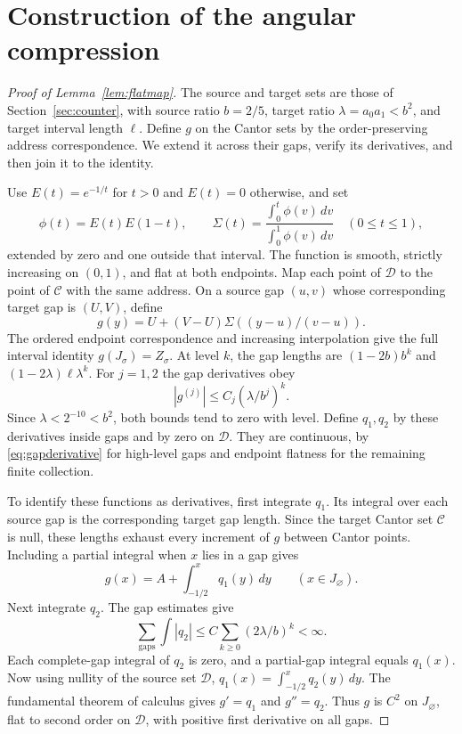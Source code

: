 \documentclass[11pt]{amsart}
\theoremstyle{definition}
\theoremstyle{remark}
\numberwithin{equation}{section}
\begin{document}
\section{Construction of the angular compression}\label{app:compression}
\begin{proof}[Proof of Lemma~\ref{lem:flatmap}]
The source and target sets are those of Section~\ref{sec:counter},
with source ratio $b=2/5$, target ratio $\lambda=a_0a_1<b^2$,
and target interval length $\ell$. Define $g$ on the Cantor sets
by the order-preserving address correspondence. We extend it
across their gaps, verify its derivatives, and then join it to
the identity.

Use $E(t)=e^{-1/t}$ for $t>0$ and $E(t)=0$ otherwise, and set
\[
\phi(t)=E(t)E(1-t),\qquad
\Sigma(t)=\frac{\int_0^t\phi(v)\,dv}{\int_0^1\phi(v)\,dv}
\quad(0\le t\le1),
\]
extended by zero and one outside that interval. The function is smooth,
strictly increasing on $(0,1)$, and flat at both endpoints.
Map each point of $\mathcal D$ to the point of $\mathcal C$ with
the same address. On a source gap $(u,v)$ whose corresponding
target gap is $(U,V)$, define
\begin{equation}\label{eq:gapinterpolation}
g(y)=U+(V-U)\Sigma((y-u)/(v-u)).
\end{equation}
The ordered endpoint correspondence and increasing interpolation
give the full interval identity $g(J_\sigma)=Z_\sigma$.
At level $k$, the gap lengths are $(1-2b)b^k$ and
$(1-2\lambda)\ell\lambda^k$. For $j=1,2$ the gap derivatives obey
\begin{equation}\label{eq:gapderivative}
|g^{(j)}|\le C_j(\lambda/b^j)^k.
\end{equation}
Since $\lambda<2^{-10}<b^2$, both bounds tend to zero with level.
Define $q_1,q_2$ by these derivatives inside gaps and by zero on
$\mathcal D$. They are continuous, by \eqref{eq:gapderivative}
for high-level gaps and endpoint flatness for the remaining finite
collection.

To identify these functions as derivatives, first integrate $q_1$.
Its integral over each source gap is the corresponding target gap
length. Since the target Cantor set $\mathcal C$ is null, these
lengths exhaust every increment of $g$ between Cantor points.
Including a partial integral when $x$ lies in a gap gives
\[
g(x)=A+\int_{-1/2}^xq_1(y)\,dy\qquad(x\in J_\varnothing).
\]
Next integrate $q_2$. The gap estimates give
\[
\sum_{\text{gaps}}\int|q_2|
                  \le C\sum_{k\ge0}(2\lambda/b)^k<\infty.
\]
Each complete-gap integral of $q_2$ is zero, and a partial-gap
integral equals $q_1(x)$. Now using nullity of the source set $\mathcal D$,
$q_1(x)=\int_{-1/2}^xq_2(y)\,dy$. The fundamental theorem of
calculus gives $g'=q_1$ and $g''=q_2$. Thus $g$ is $C^2$
on $J_\varnothing$, flat to second order on $\mathcal D$, with positive
first derivative on all gaps.


\end{proof}
\end{document}
